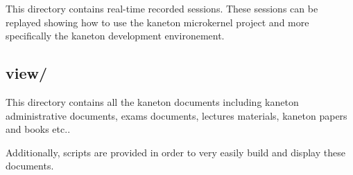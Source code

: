 This directory contains real-time recorded sessions. These sessions can be
replayed showing how to use the kaneton microkernel project and more
specifically the kaneton development environement.


\subsection*{view/}

This directory contains all the kaneton documents including kaneton
administrative documents, exams documents, lectures materials, kaneton papers
and books etc..

Additionally, scripts are provided in order to very easily build and
display these documents.
